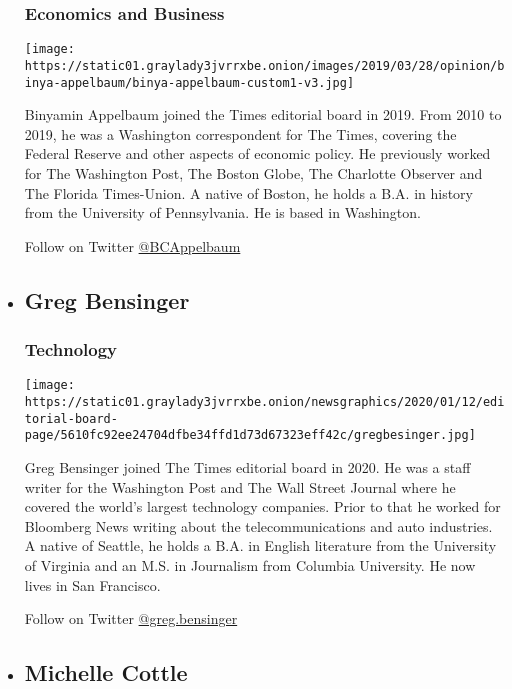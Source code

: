 \begin{itemize}
  \hypertarget{economics-and-business}{%
  \subsubsection{Economics and Business}\label{economics-and-business}}

  \texttt{[image: https://static01.graylady3jvrrxbe.onion/images/2019/03/28/opinion/binya-appelbaum/binya-appelbaum-custom1-v3.jpg]}

  Binyamin Appelbaum joined the Times editorial board in 2019. From 2010
  to 2019, he was a Washington correspondent for The Times, covering the
  Federal Reserve and other aspects of economic policy. He previously
  worked for The Washington Post, The Boston Globe, The Charlotte
  Observer and The Florida Times-Union. A native of Boston, he holds a
  B.A. in history from the University of Pennsylvania. He is based in
  Washington.

  Follow on Twitter \href{http://twitter.com/BCAppelbaum}{@BCAppelbaum}
\item
  \hypertarget{greg-bensinger}{%
  \subsection{Greg Bensinger}\label{greg-bensinger}}

  \hypertarget{technology}{%
  \subsubsection{Technology}\label{technology}}

  \texttt{[image: https://static01.graylady3jvrrxbe.onion/newsgraphics/2020/01/12/editorial-board-page/5610fc92ee24704dfbe34ffd1d73d67323eff42c/gregbesinger.jpg]}

  Greg Bensinger joined The Times editorial board in 2020. He was a
  staff writer for the Washington Post and The Wall Street Journal where
  he covered the world's largest technology companies. Prior to that he
  worked for Bloomberg News writing about the telecommunications and
  auto industries. A native of Seattle, he holds a B.A. in English
  literature from the University of Virginia and an M.S. in Journalism
  from Columbia University. He now lives in San Francisco.

  Follow on Twitter
  \href{https://twitter.com/GregBensinger}{@greg.bensinger}
\item
  \hypertarget{michelle-cottle}{%
  \subsection{Michelle Cottle}\label{michelle-cottle}}


\end{itemize}
